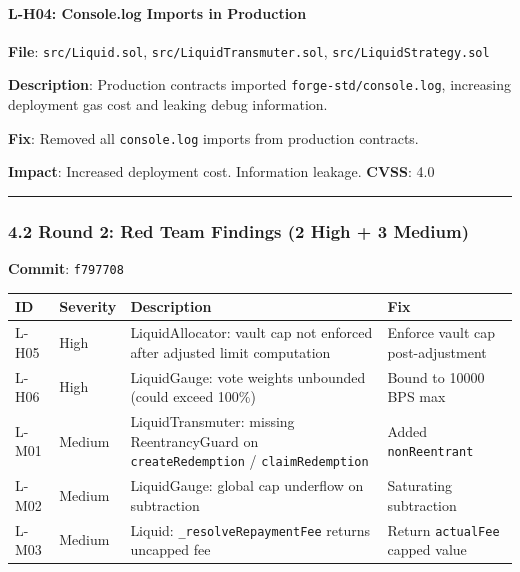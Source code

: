 \documentclass[
]{article}
\newcounter{none} %
\begin{document}
\paragraph{L-H04: Console.log Imports in
Production}\label{l-h04-consolelog-imports-in-production}

\textbf{File}: \texttt{src/Liquid.sol},
\texttt{src/LiquidTransmuter.sol}, \texttt{src/LiquidStrategy.sol}

\textbf{Description}: Production contracts imported
\texttt{forge-std/console.log}, increasing deployment gas cost and
leaking debug information.

\textbf{Fix}: Removed all \texttt{console.log} imports from production
contracts.

\textbf{Impact}: Increased deployment cost. Information leakage.
\textbf{CVSS}: 4.0

\begin{center}\rule{0.5\linewidth}{0.5pt}\end{center}

\subsubsection{4.2 Round 2: Red Team Findings (2 High + 3
Medium)}\label{42-round-2-red-team-findings-2-high--3-medium}

\textbf{Commit}: \texttt{f797708}

{\def\LTcaptype{none} %
\begin{longtable}[]{@{}llll@{}}
\toprule\noalign{}
ID & Severity & Description & Fix \\
\midrule\noalign{}
\endhead
\bottomrule\noalign{}
\endlastfoot
L-H05 & High & LiquidAllocator: vault cap not enforced after adjusted
limit computation & Enforce vault cap post-adjustment \\
L-H06 & High & LiquidGauge: vote weights unbounded (could exceed 100\%)
& Bound to 10000 BPS max \\
L-M01 & Medium & LiquidTransmuter: missing ReentrancyGuard on
\texttt{createRedemption} / \texttt{claimRedemption} & Added
\texttt{nonReentrant} \\
L-M02 & Medium & LiquidGauge: global cap underflow on subtraction &
Saturating subtraction \\
L-M03 & Medium & Liquid: \texttt{\_resolveRepaymentFee} returns uncapped
fee & Return \texttt{actualFee} capped value \\
\end{longtable}
}
\end{document}
